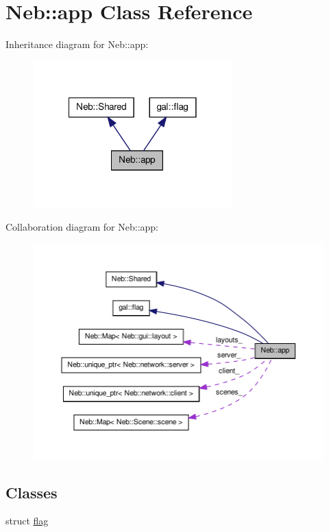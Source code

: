 \hypertarget{classNeb_1_1app}{\section{\-Neb\-:\-:app \-Class \-Reference}
\label{classNeb_1_1app}
}


\-Inheritance diagram for \-Neb\-:\-:app\-:
\nopagebreak
\begin{figure}[H]
\begin{center}
\leavevmode
\includegraphics[width=218pt]{classNeb_1_1app__inherit__graph}
\end{center}
\end{figure}


\-Collaboration diagram for \-Neb\-:\-:app\-:
\nopagebreak
\begin{figure}[H]
\begin{center}
\leavevmode
\includegraphics[width=350pt]{classNeb_1_1app__coll__graph}
\end{center}
\end{figure}
\subsection*{\-Classes}
\begin{DoxyCompactItemize}
\item 
struct \hyperlink{structNeb_1_1app_1_1flag}{flag}
\end{DoxyCompactItemize}
